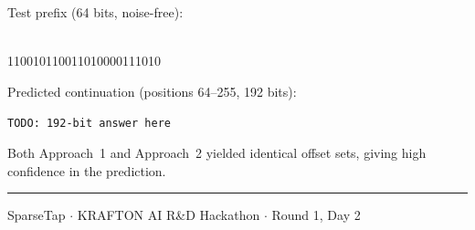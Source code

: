 \documentclass[10pt,twocolumn]{article}
\begin{document}
Test prefix (64 bits, noise-free):
\begin{center}
\small{}\\
110010110011010000111010
\end{center}

Predicted continuation (positions 64--255, 192 bits):
\begin{center}
\small\ttfamily
\texttt{TODO: 192-bit answer here}
\end{center}

Both Approach~1 and Approach~2 yielded identical offset sets,
giving high confidence in the prediction.

\vspace{4pt}
\hrule
\vspace{4pt}
{\footnotesize\color{gray}
SparseTap $\cdot$ KRAFTON AI R\&D Hackathon $\cdot$ Round 1, Day 2}
\end{document}
